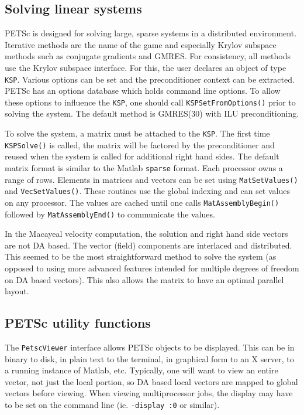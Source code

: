 \documentclass[11pt,final]{amsart}
\renewcommand{\t}[1]{\texttt{#1}}
\begin{document}
\subsection{Solving linear systems}
PETSc is designed for solving large, sparse systems in a distributed environment.
Iterative methods are the name of the game and especially Krylov subspace methods such as
conjugate gradients and GMRES. For consistency, all methods use the Krylov subspace
interface. For this, the user declares an object of type \texttt{KSP}. Various options can
be set and the preconditioner context can be extracted. PETSc has an options database
which holds command line options. To allow these options to influence the \t{KSP}, one
should call \t{KSPSetFromOptions()} prior to solving the system. The default method is
GMRES(30) with ILU preconditioning.

To solve the system, a matrix must be attached to the \t{KSP}. The first time
\t{KSPSolve()} is called, the matrix will be factored by the preconditioner and reused
when the system is called for additional right hand sides. The default matrix format is
similar to the Matlab \t{sparse} format. Each processor owns a range of rows. Elements in
matrices and vectors can be set using \t{MatSetValues()} and \t{VecSetValues()}. These
routines use the global indexing and can set values on any processor. The values are
cached until one calls \t{MatAssemblyBegin()} followed by \t{MatAssemblyEnd()} to
communicate the values.

In the Macayeal velocity computation, the solution and right hand side vectors are not DA
based. The vector (field) components are interlaced and distributed. This seemed to be the
most straightforward method to solve the system (as opposed to using more advanced
features intended for multiple degrees of freedom on DA based vectors). This also allows
the matrix to have an optimal parallel layout.

\subsection{PETSc utility functions}
The \t{PetscViewer} interface allows PETSc objects to be displayed. This can be in binary
to disk, in plain text to the terminal, in graphical form to an X server, to a running
instance of Matlab, etc. Typically, one will want to view an entire vector, not just the
local portion, so DA based local vectors are mapped to global vectors before viewing. When
viewing multiprocessor jobs, the display may have to be set on the command line (ie.
\t{-display :0} or similar).
\end{document}
